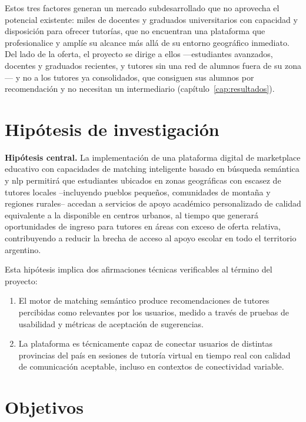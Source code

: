 Estos tres factores generan un mercado subdesarrollado que no aprovecha
el potencial existente: miles de docentes y graduados universitarios
con capacidad y disposición para ofrecer tutorías, que no encuentran
una plataforma que profesionalice y amplíe su alcance más allá de su
entorno geográfico inmediato. Del lado de la oferta, el proyecto se dirige a
ellos ---estudiantes avanzados, docentes y graduados recientes, y tutores
sin una red de alumnos fuera de su zona--- y no a los tutores ya
consolidados, que consiguen sus alumnos por recomendación y no necesitan
un intermediario (capítulo~\ref{cap:resultados}).

\section{Hipótesis de investigación}\label{sec:hipotesis}

\textbf{Hipótesis central.} La implementación de una plataforma digital
de \gls{marketplace} educativo con capacidades de \gls{matching}
inteligente basado en búsqueda semántica y \gls{nlp} permitirá que
estudiantes ubicados en zonas geográficas con escasez de tutores locales
--incluyendo pueblos pequeños, comunidades de montaña y regiones
rurales-- accedan a servicios de apoyo académico personalizado de
calidad equivalente a la disponible en centros urbanos, al tiempo que
generará oportunidades de ingreso para tutores en áreas con exceso de
oferta relativa, contribuyendo a reducir la brecha de acceso al apoyo
escolar en todo el territorio argentino.

Esta hipótesis implica dos afirmaciones técnicas verificables al término
del proyecto:

\begin{enumerate}
    \item El motor de \gls{matching} semántico produce recomendaciones de
          tutores percibidas como relevantes por los usuarios, medido a
          través de pruebas de usabilidad y métricas de aceptación de
          sugerencias.
    \item La plataforma es técnicamente capaz de conectar usuarios de
          distintas provincias del país en sesiones de tutoría virtual en
          tiempo real con calidad de comunicación aceptable, incluso en
          contextos de conectividad variable.
\end{enumerate}

\section{Objetivos}\label{sec:objetivos}


